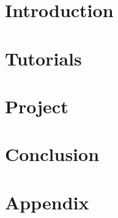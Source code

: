 \documentclass[12pt,twoside]{report}
\begin{document}




\tableofcontents

\chapter{Introduction}


\chapter{Tutorials}




\chapter{Project}


\chapter{Conclusion}


\appendix
\chapter{Appendix}



\nocite{*}

\end{document}
